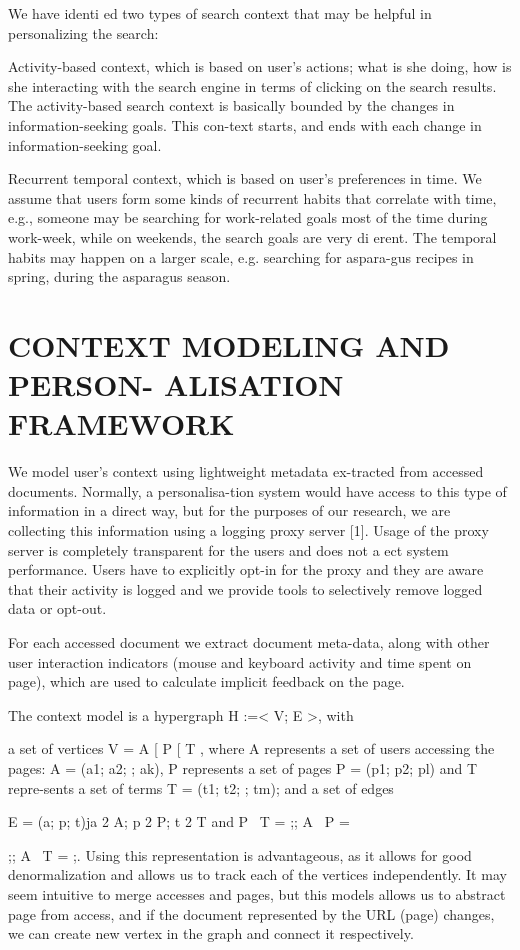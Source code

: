 \documentclass{acm_proc_article-sp} %
\begin{document}
We have identi ed two types of search context that may be helpful in personalizing the search:

Activity-based context, which is based on user's actions; what is she doing, how is she interacting with the search engine in terms of clicking on the search results. The activity-based search context is basically bounded by the changes in information-seeking goals. This con-text starts, and ends with each change in information-seeking goal. 

Recurrent temporal context, which is based on user's preferences in time. We assume that users form some kinds of recurrent habits that correlate with time, e.g., someone may be searching for work-related goals most of the time during work-week, while on weekends, the search goals are very di erent. The temporal habits may happen on a larger scale, e.g. searching for aspara-gus recipes in spring, during the asparagus season.


\section{CONTEXT MODELING AND PERSON- ALISATION FRAMEWORK}
We model user's context using lightweight metadata ex-tracted from accessed documents. Normally, a personalisa-tion system would have access to this type of information in a direct way, but for the purposes of our research, we are collecting this information using a logging proxy server [1]. Usage of the proxy server is completely transparent for the users and does not a ect system performance. Users have to explicitly opt-in for the proxy and they are aware that their activity is logged and we provide tools to selectively remove logged data or opt-out.

For each accessed document we extract document meta-data, along with other user interaction indicators (mouse and keyboard activity and time spent on page), which are used to calculate implicit feedback on the page.

The context model is a hypergraph H :=< V; E >, with

a set of vertices V  = A [ P [ T ,	where A represents a
set of users accessing the pages:  A	= (a1; a2;   ; ak), P
represents a set of pages P = (p1; p2; pl) and T repre-sents a set of terms T = (t1; t2; ; tm); and a set of edges

E = (a; p; t)ja 2 A; p 2 P; t 2 T and P \ T = ;; A \ P =

;; A \ T = ;. Using this representation is advantageous, as it allows for good denormalization and allows us to track each of the vertices independently. It may seem intuitive to merge accesses and pages, but this models allows us to abstract page from access, and if the document represented by the URL (page) changes, we can create new vertex in the graph and connect it respectively.
\end{document}
